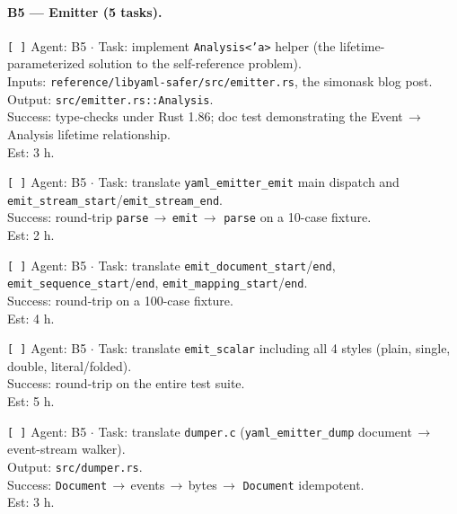 \documentclass[12pt]{article}
\theoremstyle{definition}
\theoremstyle{remark}
\begin{document}
\paragraph{B5 --- Emitter (5 tasks).}

\begin{flushleft}
\texttt{[\,]} Agent: B5 \(\cdot\) Task: implement \texttt{Analysis<'a>}
helper (the lifetime-parameterized solution to the self-reference
problem).
\\
\quad Inputs: \texttt{reference/libyaml-safer/src/emitter.rs}, the
simonask blog post.
\\
\quad Output: \texttt{src/emitter.rs::Analysis}.
\\
\quad Success: type-checks under Rust 1.86; doc test demonstrating
the Event\,$\to$\,Analysis lifetime relationship.
\\
\quad Est: 3 h.
\end{flushleft}

\begin{flushleft}
\texttt{[\,]} Agent: B5 \(\cdot\) Task: translate
\texttt{yaml\_emitter\_emit} main dispatch and
\texttt{emit\_stream\_start}/\texttt{emit\_stream\_end}.
\\
\quad Success: round-trip \texttt{parse}\,$\to$\,\texttt{emit}\,$\to$
\texttt{parse} on a 10-case fixture.
\\
\quad Est: 2 h.
\end{flushleft}

\begin{flushleft}
\texttt{[\,]} Agent: B5 \(\cdot\) Task: translate
\texttt{emit\_document\_start}/\texttt{end},
\texttt{emit\_sequence\_start}/\texttt{end},
\texttt{emit\_mapping\_start}/\texttt{end}.
\\
\quad Success: round-trip on a 100-case fixture.
\\
\quad Est: 4 h.
\end{flushleft}

\begin{flushleft}
\texttt{[\,]} Agent: B5 \(\cdot\) Task: translate
\texttt{emit\_scalar} including all 4 styles (plain, single,
double, literal/folded).
\\
\quad Success: round-trip on the entire test suite.
\\
\quad Est: 5 h.
\end{flushleft}

\begin{flushleft}
\texttt{[\,]} Agent: B5 \(\cdot\) Task: translate \texttt{dumper.c}
(\texttt{yaml\_emitter\_dump} document\,$\to$\,event-stream
walker).
\\
\quad Output: \texttt{src/dumper.rs}.
\\
\quad Success: \texttt{Document}\,$\to$\,events\,$\to$\,bytes\,$\to$
\texttt{Document} idempotent.
\\
\quad Est: 3 h.
\end{flushleft}
\end{document}
